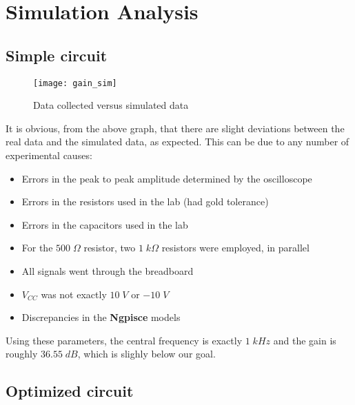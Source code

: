 \newpage

\section{Simulation Analysis}
\label{sec:simulation}

\subsection{Simple circuit}

\begin{figure}[H]
\centering
\texttt{[image: gain\_sim]}
\caption{Data collected versus simulated data}
\label{data_graph_sim}
\end{figure}

It is obvious, from the above graph, that there are slight deviations between the real data and the simulated data, as expected. This can be due to any number of experimental causes:

\begin{itemize}

\item Errors in the peak to peak amplitude determined by the oscilloscope

\item Errors in the resistors used in the lab (had gold tolerance)

\item Errors in the capacitors used in the lab

\item For the $500\;\Omega$ resistor, two $1\;k\Omega$ resistors were employed, in parallel

\item All signals went through the breadboard

\item $V_{CC}$ was not exactly $10\;V$ or $-10\;V$

\item Discrepancies in the {\bf Ngpisce} models

\end{itemize}

Using these parameters, the central frequency is exactly $1\;kHz$ and the gain is roughly $36.55\;dB$, which is slighly below our goal.

\subsection{Optimized circuit}
